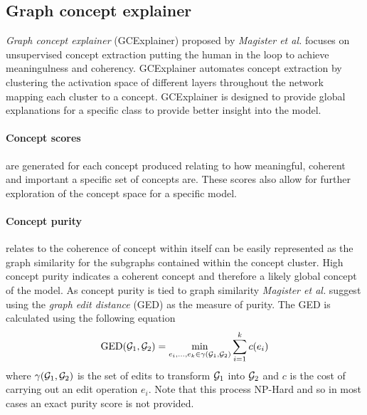 

\subsection{Graph concept explainer}
\label{sec:GCE}



\emph{Graph concept explainer} (GCExplainer) proposed by \textit{Magister et al.}\cite{magister2021gcexplainer} focuses on unsupervised concept extraction putting the human in the loop to achieve meaningulness and coherency.
GCExplainer automates concept extraction by clustering the activation space of different layers throughout the network mapping each cluster to a concept.
GCExplainer is designed to provide global explanations for a specific class to provide better insight into the model.



\paragraph{Concept scores} are generated for each concept produced relating to how meaningful, coherent and important a specific set of concepts are.
These scores also allow for further exploration of the concept space for a specific model.

\paragraph{Concept purity}
relates to the coherence of concept within itself can be easily represented as the graph similarity for the subgraphs contained within the concept cluster.
High concept purity indicates a coherent concept and therefore a likely global concept of the model.
As concept purity is tied to graph similarity \textit{Magister et al.}\cite{magister2021gcexplainer} suggest using the \emph{graph edit distance} (GED) as the measure of purity.
The GED is calculated using the following equation
\begin{equation}
    \label{eq:GED}
    \operatorname{GED}({\mathcal{G}}_1, {\mathcal{G}}_2) = \underset{e_i,...,e_k \in \gamma({\mathcal{G}}_1, {\mathcal{G}}_2)}{\operatorname{min}} \sum_{i=1}^{k}c(e_i)
\end{equation}
where $\gamma({\mathcal{G}}_1, {\mathcal{G}}_2)$ is the set of edits to transform ${\mathcal{G}}_1$ into ${\mathcal{G}}_2$ and $c$ is the cost of carrying out an edit operation $e_i$.
Note that this process NP-Hard and so in most cases an exact purity score is not provided.

